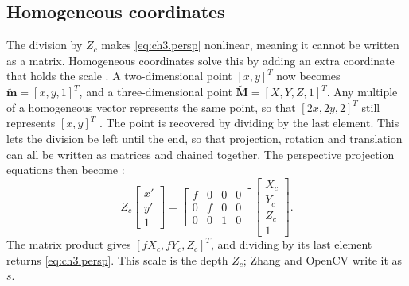\subsection{Homogeneous coordinates}
\label{subsec:ch3.homogeneous}
The division by $Z_c$ makes \autoref{eq:ch3.persp} nonlinear, meaning it cannot be written as a matrix. Homogeneous coordinates
solve this by adding an extra coordinate that holds the scale \cite{hataCS231ACourseNotesLink,hartleyMultipleViewGeometry2004}. A two-dimensional point $[x, y]^T$
now becomes $\tilde{\mathbf{m}} = [x, y, 1]^T$, and a three-dimensional point $\tilde{\mathbf{M}} = [X, Y, Z, 1]^T$. Any multiple of a
homogeneous vector represents the same point, so that $[2x, 2y, 2]^T$ still represents $[x, y]^T$ \cite{hartleyMultipleViewGeometry2004}. The point is recovered by dividing
by the last element. This lets the division be left until the end, so that projection, rotation and translation can all be
written as matrices and chained together. The perspective projection equations then become \cite{hartleyMultipleViewGeometry2004}:
\begin{equation}
	Z_c
	\begin{bmatrix} x' \\ y' \\ 1 \end{bmatrix}
	=
	\begin{bmatrix}
		f & 0 & 0 & 0 \\
		0 & f & 0 & 0 \\
		0 & 0 & 1 & 0
	\end{bmatrix}
	\begin{bmatrix} X_c \\ Y_c \\ Z_c \\ 1 \end{bmatrix}.
	\label{eq:ch3.persp_homog}
\end{equation}
The matrix product gives $[fX_c, fY_c, Z_c]^T$, and dividing by its last element returns \autoref{eq:ch3.persp}. This scale is the depth $Z_c$;
Zhang \cite{zhangFlexibleNewTechnique2000} and OpenCV write it as $s$. 
